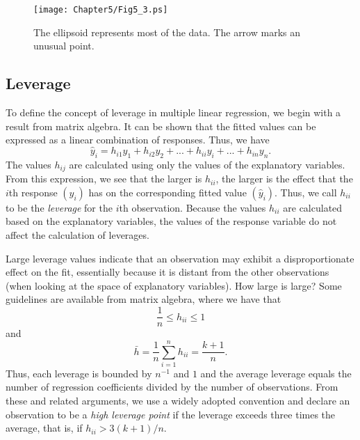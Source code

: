 \begin{figure}[htp]
  \begin{center}
    \texttt{[image: Chapter5/Fig5\_3.ps]}
    \caption{\label{F5:Ellipsoid} \small  The ellipsoid
represents most of the data. The arrow marks an unusual point.}
  \end{center}
\end{figure}



\subsection{Leverage}\label{S5:Leverage}

To define the concept of leverage in multiple linear regression, we
begin with a result from matrix algebra. It can be shown that the
fitted values can be expressed as a linear combination of responses.
Thus, we have
\begin{equation*}
\hat{y}_{i}=h_{i1}y_{1}+h_{i2}y_{2}+...+h_{ii}y_{i}+...+h_{in}y_{n}.
\end{equation*}
The values $h_{ij}$ are calculated using only the values of the
explanatory variables. From this expression, we see that the larger
is $h_{ii}$, the larger is the effect that the $i$th response
$(y_i)$ has on the corresponding fitted value $(\hat{y}_i)$. Thus,
we call $h_{ii}$ to be the \textit{leverage }for the $i$th
observation. Because the values $h_{ii}$ are calculated based on the
explanatory variables, the values of the response variable do not
affect the calculation of leverages.

Large leverage values indicate that an observation may exhibit a
disproportionate effect on the fit, essentially because it is
distant from the other observations (when looking at the space of
explanatory variables). How large is large? Some guidelines are
available from matrix algebra, where we have that
\begin{equation*}
\frac{1}{n}\leq h_{ii}\leq 1
\end{equation*}
and
\begin{equation*}
\bar{h}=\frac{1}{n}\sum_{i=1}^{n}h_{ii}=\frac{k+1}{n}.
\end{equation*}
Thus, each leverage is bounded by $n^{-1}$ and $1$ and the average
leverage equals the number of regression coefficients divided by the
number of observations. From these and related arguments, we use a
widely adopted convention and declare an observation to be a
\textit{high leverage point} if the leverage exceeds three times the
average, that is, if $h_{ii}>3(k+1)/n $.


